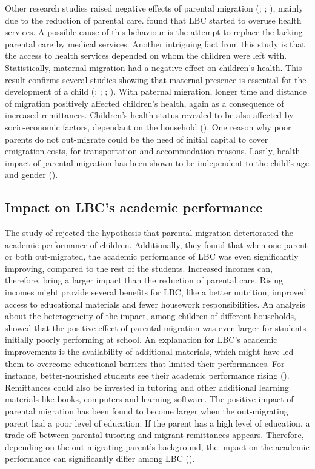 Other research studies raised negative effects of parental migration (\cite{amato1999nonresident}; \cite{kanaiaupuni2000reframing}; \cite{fernandez1998fathers}), mainly due to the reduction of parental care. \textcite{song2009health} found that LBC started to overuse health services. A possible cause of this behaviour is the attempt to replace the lacking parental care by medical services. Another intriguing fact from this study is that the access to health services depended on whom the children were left with. Statistically, maternal migration had a negative effect on children's health. This result confirms several studies showing that maternal presence is essential for the development of a child (\cite{cortes2015feminization}; \cite{jampaklay2006parental}; \cite{macours2010seasonal}; \cite{thomas1994like}). With paternal migration, longer time and distance of migration positively affected children's health, again as a consequence of increased remittances. Children's health status revealed to be also affected by socio-economic factors, dependant on the household (\cite{behrman1996impact}). One reason why poor parents do not out-migrate could be the need of initial capital to cover emigration costs, for transportation and accommodation reasons. Lastly, health impact of parental migration has been shown to be independent to the child's age and gender (\cite{guo2017effect}). 

\subsection{Impact on LBC's academic performance}
\label{subsec:impact_academic_performance}

The study of \textcite{bai2017effect} rejected the hypothesis that parental migration deteriorated the academic performance of children. Additionally, they found that when one parent or both out-migrated, the academic performance of LBC was even significantly improving, compared to the rest of the students. Increased incomes can, therefore, bring a larger impact than the reduction of parental care. Rising incomes might provide several benefits for LBC, like a better nutrition, improved access to educational materials and fewer housework responsibilities. An analysis about the heterogeneity of the impact, among children of different households, showed that the positive effect of parental migration was even larger for students initially poorly performing at school. An explanation for LBC's academic improvements is the availability of additional materials, which might have led them to overcome educational barriers that limited their performances. For instance, better-nourished students see their academic performance rising (\cite{luo2012nutrition}). Remittances could also be invested in tutoring and other additional learning materials like books, computers and learning software. The positive impact of parental migration has been found to become larger when the out-migrating parent had a poor level of education. If the parent has a high level of education, a trade-off between parental tutoring and migrant remittances appears. Therefore, depending on the out-migrating parent's background, the impact on the academic performance can significantly differ among LBC (\cite{sawyer2016money}). 

